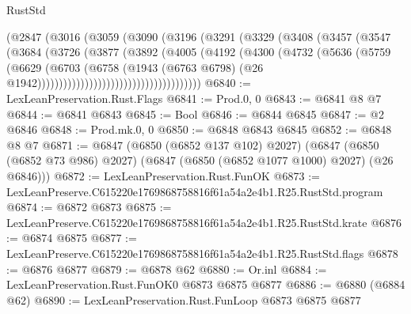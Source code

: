 \begin{lexlean}{RustStd}
\begin{coremodule}
                              (@2847
                                (@3016
                                  (@3059
                                    (@3090
                                      (@3196
                                        (@3291
                                          (@3329
                                            (@3408
                                              (@3457
                                                (@3547
                                                  (@3684
                                                    (@3726
                                                      (@3877
                                                        (@3892
                                                          (@4005
                                                            (@4192
                                                              (@4300
                                                                (@4732
                                                                  (@5636
                                                                    (@5759
                                                                      (@6629
                                                                        (@6703
                                                                          (@6758
                                                                            (@1943
                                                                              (@6763 @6798)
                                                                              (@26
                                                                                @1942))))))))))))))))))))))))))))))))))))))
@6840 := LexLeanPreservation.Rust.Flags
@6841 := Prod.{0, 0}
@6843 := @6841 @8 @7
@6844 := @6841 @6843
@6845 := Bool
@6846 := @6844 @6845
@6847 := @2 @6846
@6848 := Prod.mk.{0, 0}
@6850 := @6848 @6843 @6845
@6852 := @6848 @8 @7
@6871 := @6847
    (@6850 (@6852 @137 @102) @2027)
    (@6847 (@6850 (@6852 @73 @986) @2027) (@6847 (@6850 (@6852 @1077 @1000) @2027) (@26 @6846)))
@6872 := LexLeanPreservation.Rust.FunOK
@6873 := LexLeanPreserve.C615220e1769868758816f61a54a2e4b1.R25.RustStd.program
@6874 := @6872 @6873
@6875 := LexLeanPreserve.C615220e1769868758816f61a54a2e4b1.R25.RustStd.krate
@6876 := @6874 @6875
@6877 := LexLeanPreserve.C615220e1769868758816f61a54a2e4b1.R25.RustStd.flags
@6878 := @6876 @6877
@6879 := @6878 @62
@6880 := Or.inl
@6884 := LexLeanPreservation.Rust.FunOK0 @6873 @6875 @6877
@6886 := @6880 (@6884 @62)
@6890 := LexLeanPreservation.Rust.FunLoop @6873 @6875 @6877

\end{coremodule}
\end{lexlean}
